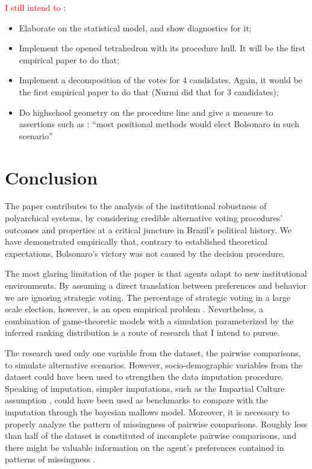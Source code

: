 \documentclass[hidelinks,11pt]{article}
\begin{document}
    \textcolor{red}{I still intend to }:
    \begin{itemize}
      \item Elaborate on the statistical model, and show diagnostics for it;
      \item Implement the opened tetrahedron with its procedure hull. It will be the first empirical paper to do that;
      \item Implement a decomposition of the votes for 4 candidates. Again, it would be the first empirical paper to do that (Nurmi did that for 3 candidates);
      \item Do highschool geometry on the procedure line and give a measure to assertions such as : ``most positional methods would elect Bolsonaro in such scenario''
    \end{itemize}
\section{Conclusion}

The paper contributes to the analysis of the institutional robustness of
polyarchical systems, by considering credible alternative voting procedures'
outcomes and properties at a critical juncture in Brazil's political history. We
have demonstrated empirically that, contrary to established
theoretical expectations, Bolsonaro's victory was not caused by the decision
procedure.

The most glaring limitation of the paper is that agents adapt to new
institutional environments. By assuming a direct
translation between preferences and behavior we are ignoring strategic voting.
The percentage of strategic voting in a large scale election, however, is an
open empirical problem \parencite{straeten10_strat_sincer_heuris_votin_under,kawai2013inferring}. Nevertheless, a
combination of game-theoretic models with a simulation parameterized by the
inferred ranking distribution is a route of research that I intend to pursue.

The research used only one variable from the dataset, the pairwise
comparisons, to simulate alternative scenarios. However, socio-demographic
variables from the dataset could have been used to strengthen the data
imputation procedure. Speaking of imputation, simpler imputations, such as the
Impartial Culture assumption \parencite{regenwetter2006behavioral}, could have been
used as benchmarks to compare with the imputation through the bayesian mallows
model. Moreover, it is necessary to properly analyze the pattern of missingness
of pairwise comparisons. Roughly less than half of the dataset is constituted of
incomplete pairwise comparisons, and there might be valuable information on the
agent's preferences contained in patterns of missingness
\parencite{mcelreath2020statistical}.
\end{document}
